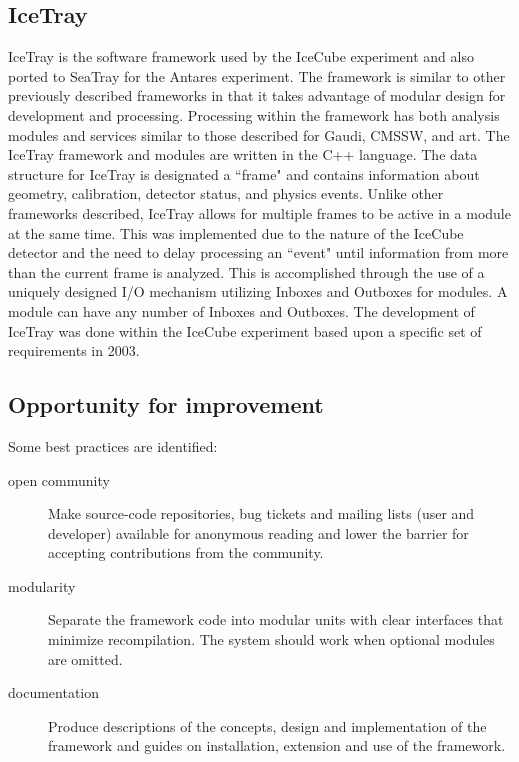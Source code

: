 \subsection{IceTray}

IceTray\cite{icetray} is the software framework used by the IceCube experiment and also ported to SeaTray for the Antares experiment. The framework is similar to other previously described frameworks in that it takes advantage of modular design for development and processing. Processing within the framework has both analysis modules and services similar to those described for Gaudi, CMSSW, and art. The IceTray framework and modules are written in the C++ language. The data structure for IceTray is designated a ``frame" and contains information about geometry, calibration, detector status, and physics events. Unlike other frameworks described, IceTray allows for multiple frames to be active in a module at the same time. This was implemented due to the nature of the IceCube detector and the need to delay processing an ``event" until information from more than the current frame is analyzed. This is accomplished through the use of a uniquely designed I/O mechanism utilizing Inboxes and Outboxes for modules. A module can have any number of Inboxes and Outboxes. The development of IceTray was done within the IceCube experiment based upon a specific set of requirements in 2003.

\subsection{Opportunity for improvement}

Some best practices are identified:

\begin{description}
\item[open community] Make source-code repositories, bug tickets and
  mailing lists (user and developer) available for anonymous reading
  and lower the barrier for accepting contributions from the community.

\item[modularity] Separate the framework code into modular units with
  clear interfaces that minimize recompilation.  The system should
  work when optional modules are omitted.

\item[documentation] Produce descriptions of the concepts, design and
  implementation of the framework and guides on installation,
  extension and use of the framework.
\end{description}

